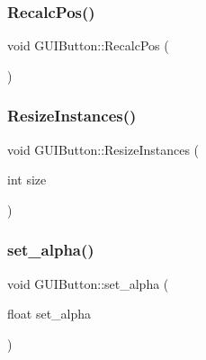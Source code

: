\hypertarget{class_g_u_i_button_a82d7160f21e4583c3d3b301c9878b12a}{}\label{class_g_u_i_button_a82d7160f21e4583c3d3b301c9878b12a} 
\subsubsection{\texorpdfstring{Recalc\+Pos()}{RecalcPos()}}
{\footnotesize\ttfamily void G\+U\+I\+Button\+::\+Recalc\+Pos (\begin{DoxyParamCaption}{ }\end{DoxyParamCaption})}

\hypertarget{class_g_u_i_button_acc1ba3e2166e3bf646906b533386262b}{}\label{class_g_u_i_button_acc1ba3e2166e3bf646906b533386262b} 
\subsubsection{\texorpdfstring{Resize\+Instances()}{ResizeInstances()}}
{\footnotesize\ttfamily void G\+U\+I\+Button\+::\+Resize\+Instances (\begin{DoxyParamCaption}\item[{int}]{size }\end{DoxyParamCaption})}

\hypertarget{class_g_u_i_button_a7329744a9d9d7382fc8b6a013638304b}{}\label{class_g_u_i_button_a7329744a9d9d7382fc8b6a013638304b} 
\subsubsection{\texorpdfstring{set\+\_\+alpha()}{set\_alpha()}}
{\footnotesize\ttfamily void G\+U\+I\+Button\+::set\+\_\+alpha (\begin{DoxyParamCaption}\item[{float}]{set\+\_\+alpha }\end{DoxyParamCaption})}

\hypertarget{class_g_u_i_button_a6046039919c8c1c4592aeee3cde40b33}{}\label{class_g_u_i_button_a6046039919c8c1c4592aeee3cde40b33} 
